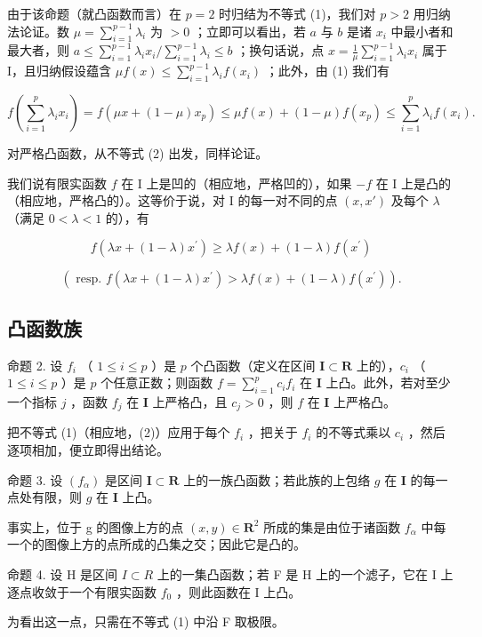 由于该命题（就凸函数而言）在 \(p = 2\) 时归结为不等式 (1)，我们对 \(p > 2\) 用归纳法论证。数 \(\mu = \sum_{i=1}^{p-1} \lambda_i\) 为 \(> 0\) ；立即可以看出，若 \(a\) 与 \(b\) 是诸 \(x_i\) 中最小者和最大者，则 \(a \leqslant \sum_{i=1}^{p-1} \lambda_i x_i / \sum_{i=1}^{p-1} \lambda_i \leqslant b\) ；换句话说，点 \(x = \frac{1}{\mu} \sum_{i=1}^{p-1} \lambda_i x_i\) 属于 I，且归纳假设蕴含 \(\mu f(x) \leqslant \sum_{i=1}^{p-1} \lambda_i f(x_i)\) ；此外，由 (1) 我们有

\[
f \left(\sum_ {i = 1} ^ {p} \lambda_ {i} x _ {i}\right) = f (\mu x + (1 - \mu) x _ {p}) \leqslant \mu f (x) + (1 - \mu) f (x _ {p}) \leqslant \sum_ {i = 1} ^ {p} \lambda_ {i} f (x _ {i}).
\]

对严格凸函数，从不等式 (2) 出发，同样论证。

我们说有限实函数 \(f\) 在 I 上是凹的（相应地，严格凹的），如果 \(-f\) 在 I 上是凸的（相应地，严格凸的）。这等价于说，对 I 的每一对不同的点 \((x, x')\) 及每个 \(\lambda\) （满足 \(0 < \lambda < 1\) 的），有

\[
f (\lambda x + (1 - \lambda) x ^ {\prime}) \geqslant \lambda f (x) + (1 - \lambda) f (x ^ {\prime})
\]

\[
(\text { resp. } f (\lambda x + (1 - \lambda) x ^ {\prime}) > \lambda f (x) + (1 - \lambda) f (x ^ {\prime})).
\]

\subsection{凸函数族}

命题 2. 设 \(f_{i}\) （ \(1 \leqslant i \leqslant p\) ）是 \(p\) 个凸函数（定义在区间 \(\mathbf{I} \subset \mathbf{R}\) 上的），\(c_{i}\) （ \(1 \leqslant i \leqslant p\) ）是 \(p\) 个任意正数；则函数 \(f = \sum_{i=1}^{p} c_{i} f_{i}\) 在 \(\mathbf{I}\) 上凸。此外，若对至少一个指标 \(j\) ，函数 \(f_{j}\) 在 \(\mathbf{I}\) 上严格凸，且 \(c_{j} > 0\) ，则 \(f\) 在 \(\mathbf{I}\) 上严格凸。

把不等式 (1)（相应地，(2)）应用于每个 \(f_{i}\) ，把关于 \(f_{i}\) 的不等式乘以 \(c_{i}\) ，然后逐项相加，便立即得出结论。

命题 3. 设 \((f_{\alpha})\) 是区间 \(\mathbf{I} \subset \mathbf{R}\) 上的一族凸函数；若此族的上包络 \(g\) 在 \(\mathbf{I}\) 的每一点处有限，则 \(g\) 在 \(\mathbf{I}\) 上凸。

事实上，位于 g 的图像上方的点 \((x, y) \in \mathbf{R}^{2}\) 所成的集是由位于诸函数 \(f_{\alpha}\) 中每一个的图像上方的点所成的凸集之交；因此它是凸的。

命题 4. 设 H 是区间 \(I \subset R\) 上的一集凸函数；若 F 是 H 上的一个滤子，它在 I 上逐点收敛于一个有限实函数 \(f_{0}\) ，则此函数在 I 上凸。

为看出这一点，只需在不等式 (1) 中沿 F 取极限。
